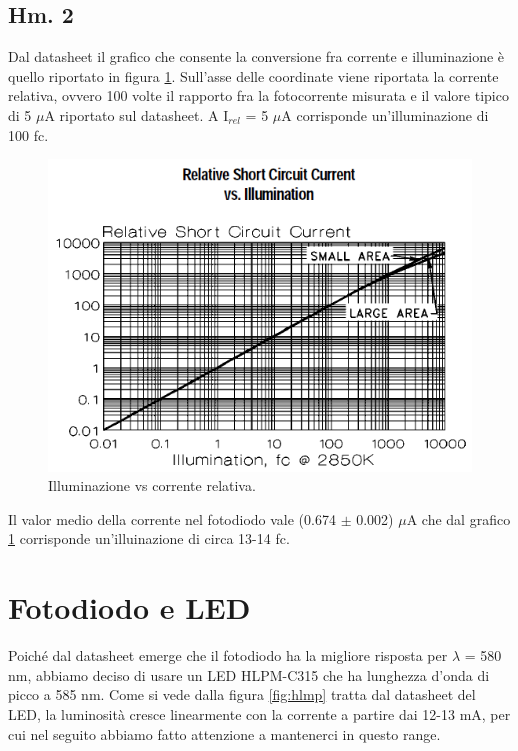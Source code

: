 \documentclass[journal, a4paper]{IEEEtran}
\begin{document}
\subsection{Hm. 2}
Dal datasheet il grafico che consente la conversione fra corrente e illuminazione è quello riportato in figura \ref{fig:relcur}. Sull'asse delle coordinate viene riportata la corrente relativa, ovvero 100 volte il rapporto fra la fotocorrente misurata e il valore tipico di 5 $\mu$A riportato sul datasheet. A I$_{rel}$ = 5 $\mu$A corrisponde un'illuminazione di 100 fc.

\begin{figure}[htp]
\centering
\includegraphics[scale=.5]{current}
\caption{Illuminazione vs corrente relativa.}
\label{fig:relcur}
\end{figure}

Il valor medio della corrente nel fotodiodo vale (0.674 $\pm$ 0.002) $\mu$A che dal grafico \ref{fig:relcur} corrisponde un'illuinazione di circa 13-14 fc.

\section{Fotodiodo e LED}

Poiché dal datasheet emerge che il fotodiodo ha la migliore risposta per $\lambda$ = 580 nm, abbiamo deciso di usare un LED HLPM-C315 che ha lunghezza d'onda di picco a 585 nm. Come si vede dalla figura \ref{fig:hlmp} tratta dal datasheet del LED, la luminosità cresce linearmente con la corrente a partire dai 12-13 mA, per cui nel seguito abbiamo fatto attenzione a mantenerci in questo range.
\end{document}
